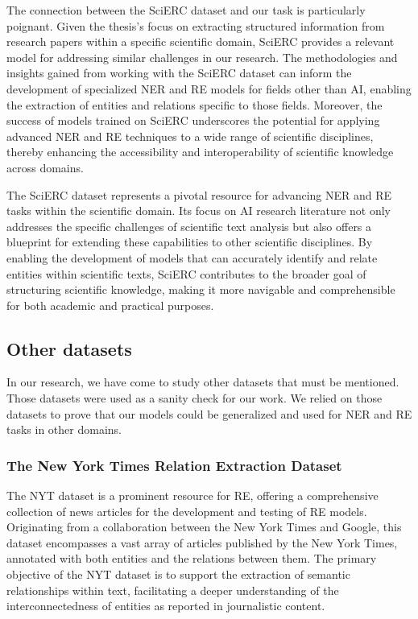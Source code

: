 The connection between the SciERC dataset and our task is particularly poignant. Given the thesis's focus on extracting structured information from research papers within a specific scientific domain, SciERC provides a relevant model for addressing similar challenges in our research. The methodologies and insights gained from working with the SciERC dataset can inform the development of specialized NER and RE models for fields other than AI, enabling the extraction of entities and relations specific to those fields. Moreover, the success of models trained on SciERC underscores the potential for applying advanced NER and RE techniques to a wide range of scientific disciplines, thereby enhancing the accessibility and interoperability of scientific knowledge across domains.

The SciERC dataset represents a pivotal resource for advancing NER and RE tasks within the scientific domain. Its focus on AI research literature not only addresses the specific challenges of scientific text analysis but also offers a blueprint for extending these capabilities to other scientific disciplines. By enabling the development of models that can accurately identify and relate entities within scientific texts, SciERC contributes to the broader goal of structuring scientific knowledge, making it more navigable and comprehensible for both academic and practical purposes.
\subsection{Other datasets}
\label{sec:otherdataset}
In our research, we have come to study other datasets that must be mentioned. Those datasets were used as a sanity check for our work. We relied on those datasets to prove that our models could be generalized and used for NER and RE tasks in other domains.
\subsubsection{The New York Times Relation Extraction Dataset}
\label{sec:nytdataset}

The \ac{NYT dataset} is a prominent resource for RE, offering a comprehensive collection of news articles for the development and testing of RE models. Originating from a collaboration between the New York Times and Google, this dataset encompasses a vast array of articles published by the New York Times, annotated with both entities and the relations between them\cite{NYTRE}. The primary objective of the NYT dataset is to support the extraction of semantic relationships within text, facilitating a deeper understanding of the interconnectedness of entities as reported in journalistic content.

